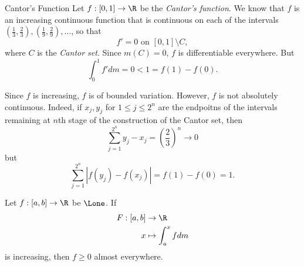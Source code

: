 \documentclass[pmath451]{subfiles}
\begin{document}
    \begin{example}{Cantor's Function}
        Let $f:\left[ 0,1 \right]\to\R$ be the \textit{Cantor's function}. We know that $f$ is an increasing continuous function that is continuous on each of the intervals $\left( \frac{1}{3},\frac{2}{3} \right),\left( \frac{1}{9},\frac{2}{9} \right),\ldots$, so that
        \begin{equation*}
            f' = 0 \text{ on }\left[ 0,1 \right]\setminus C,
        \end{equation*}
        where $C$ is the \textit{Cantor set}. Since $m\left( C \right) = 0$, $f$ is differentiable everywhere. But
        \begin{equation*}
            \int^{1}_{0}f'dm = 0 < 1 = f\left( 1 \right)-f\left( 0 \right).
        \end{equation*}

        Since $f$ is increasing, $f$ is of bounded variation. However, $f$ is not absolutely continuous. Indeed, if $x_j,y_j$ for $1\leq j\leq 2^n$ are the endpoitns of the intervals remaining at $n$th stage of the construction of the Cantor set, then
        \begin{equation*}
            \sum^{2^n}_{j=1} y_j-x_j = \left( \frac{2}{3} \right)^n\to 0
        \end{equation*}
        but
        \begin{equation*}
            \sum^{2^n}_{j=1} \left| f\left( y_j \right)-f\left( x_j \right) \right| = f\left( 1 \right)-f\left( 0 \right) = 1.
        \end{equation*}
    \end{example}

    \rruleline
    
    \begin{prop}{}
        Let $f:\left[ a,b \right]\to\R$ be $\Lone$. If
        \begin{equation*}
            \begin{aligned}
                F:\left[ a,b \right]&\to\R \\
                x&\mapsto \int^{x}_{a}fdm
            \end{aligned} 
        \end{equation*}
        is increasing, then $f\geq 0$ almost everywhere.
    \end{prop}
    
\end{document}
